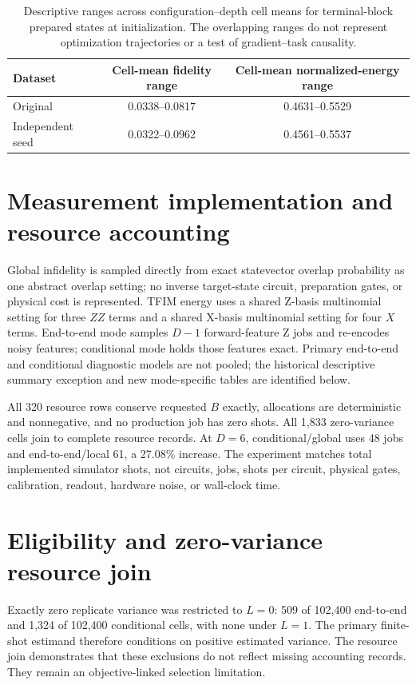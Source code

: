 \documentclass[pdflatex,sn-basic,Numbered]{sn-jnl}
\begin{document}
\begin{table}[t]
\centering
\small
\begin{tabular}{lcc}
\toprule
Dataset & Cell-mean fidelity range & Cell-mean normalized-energy range \\
\midrule
Original & 0.0338--0.0817 & 0.4631--0.5529 \\
Independent seed & 0.0322--0.0962 & 0.4561--0.5537 \\
\bottomrule
\end{tabular}
\caption{Descriptive ranges across configuration--depth cell means for terminal-block prepared states at initialization. The overlapping ranges do not represent optimization trajectories or a test of gradient--task causality.}
\label{supp:tab:prepared-state-ranges}
\end{table}

\section{Measurement implementation and resource accounting}

Global infidelity is sampled directly from exact statevector overlap probability as one abstract overlap setting; no inverse target-state circuit, preparation gates, or physical cost is represented. TFIM energy uses a shared Z-basis multinomial setting for three $ZZ$ terms and a shared X-basis multinomial setting for four $X$ terms. End-to-end mode samples $D-1$ forward-feature Z jobs and re-encodes noisy features; conditional mode holds those features exact. Primary end-to-end and conditional diagnostic models are not pooled; the historical descriptive summary exception and new mode-specific tables are identified below.

All 320 resource rows conserve requested $B$ exactly, allocations are deterministic and nonnegative, and no production job has zero shots. All 1,833 zero-variance cells join to complete resource records. At $D=6$, conditional/global uses 48 jobs and end-to-end/local 61, a 27.08\% increase. The experiment matches total implemented simulator shots, not circuits, jobs, shots per circuit, physical gates, calibration, readout, hardware noise, or wall-clock time.

\section{Eligibility and zero-variance resource join}

Exactly zero replicate variance was restricted to $L=0$: 509 of 102,400 end-to-end and 1,324 of 102,400 conditional cells, with none under $L=1$. The primary finite-shot estimand therefore conditions on positive estimated variance. The resource join demonstrates that these exclusions do not reflect missing accounting records. They remain an objective-linked selection limitation.
\end{document}
